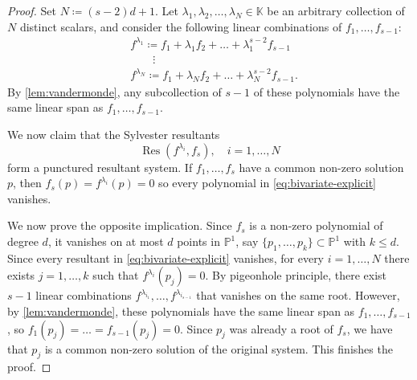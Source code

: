 \documentclass[11pt,a4paper]{article}
\numberwithin{equation}{section}
\newcommand{\PP}{\mathbb{P}}
\newcommand{\KK}{\mathbb{K}}
\DeclareMathOperator{\Res}{Res}
\begin{document}
\begin{proof}
    Set $N\coloneqq (s-2)d+1$.
    Let $\lambda_1,\lambda_2,\dots, \lambda_{N}\in \KK$ be an arbitrary collection of $N$ distinct scalars, and consider the following linear combinations of $f_1,\dots,f_{s-1}$:\[
    \begin{split}
        & f^{\lambda_1}\coloneqq f_1 + \lambda_1 f_2 + \dots + \lambda_1^{s-2} f_{s-1}\\
        &\qquad\vdots\\
        & f^{\lambda_N}\coloneqq f_1 + \lambda_N f_2 + \dots + \lambda_N^{s-2} f_{s-1}.
    \end{split}
    \]
   By \cref{lem:vandermonde}, any subcollection of $s-1$ of these polynomials have the same linear span as $f_1,\dots,f_{s-1}$.
    
    We now claim that the Sylvester resultants \begin{equation}
    \label{eq:bivariate-explicit}
    \Res(f^{\lambda_i}, f_s ), \quad i=1,\dots,N        
    \end{equation}
     form a punctured resultant system.
   If $f_1,\dots,f_s$ have a common non-zero solution $p$, then $f_s(p)=f^{\lambda_i}(p)=0$ so every polynomial in \eqref{eq:bivariate-explicit} vanishes.

    We now prove the opposite implication.
    Since $f_s$ is a non-zero polynomial of degree $d$, it vanishes on at most $d$ points in $\PP^1$, say $\{p_1,\dots,p_k\}\subset\PP^1$ with $k\leq d$.
    Since every resultant in \eqref{eq:bivariate-explicit} vanishes, for every $i=1,\dots,N$ there exists $j=1,\dots,k$ such that $f^{\lambda_i}(p_j)=0$.
    By pigeonhole principle, there exist $s-1$ linear combinations $f^{\lambda_{i_1}},\dots,f^{\lambda_{i_{s-1}}}$ that vanishes on the same root.
    However, by \cref{lem:vandermonde}, these polynomials have the same linear span as $f_1,\dots,f_{s-1}$, so $f_1(p_j)=\dots=f_{s-1}(p_j)=0$.
    Since $p_j$ was already a root of $f_s$, we have that $p_j$ is a common non-zero solution of the original system.
    This finishes the proof.
\end{proof}
\end{document}
